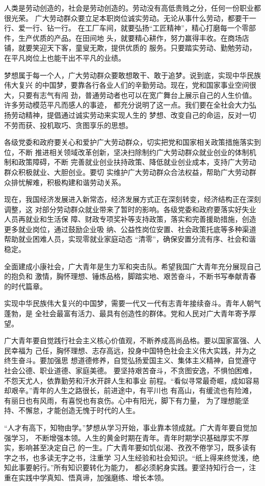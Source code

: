 \documentclass[11pt]{ctexart}
\begin{document}
{{{{人类是劳动创造的，社会是劳动创造的。劳动没有高低贵贱之分，任何一份职业都很光荣。
广大劳动群众要立足本职岗位诚实劳动。无论从事什么劳动，都要干一行、爱一行、钻一行。
在工厂车间，就要弘扬“工匠精神”，精心打磨每一个零部件，生产优质的产品。在田间地
头，就要精心耕作，努力赢得丰收。在商场店铺，就要笑迎天下客，童叟无欺，提供优质的
服务。只要踏实劳动、勤勉劳动，在平凡岗位上也能干出不平凡的业绩。

梦想属于每一个人，广大劳动群众要敢想敢干、敢于追梦。说到底，实现中华民族伟大复兴
的中国梦，要靠各行各业人们的辛勤劳动。现在，党和国家事业空间很大，只要有志气有闯
劲，普通劳动者也可以在宽广舞台上展示自己的人生价值。许多劳动模范平凡而感人的事迹，
都充分说明了这一点。我们要在全社会大力弘扬劳动精神，提倡通过诚实劳动来实现人生的
梦想、改变自己的命运，反对一切不劳而获、投机取巧、贪图享乐的思想。

各级党委和政府要关心和爱护广大劳动群众，切实把党和国家相关政策措施落实到位，不断
推进相关领域改革创新，坚决扫除制约广大劳动群众就业创业的体制机制和政策障碍，不断
完善就业创业扶持政策、降低就业创业成本，支持广大劳动群众积极就业、大胆创业。要切
实维护广大劳动群众合法权益，帮助广大劳动群众排忧解难，积极构建和谐劳动关系。

现在，我国经济发展进入新常态，经济发展方式正在深刻转变，经济结构正在深刻调整，这
对部分劳动群众就业带来了暂时的影响。各级党委和政府要落实好失业人员再就业和生活保
障、财政专项奖补等支持政策，落实和完善援助措施，创造更多就业岗位，通过鼓励企业吸
纳、公益性岗位安置、社会政策托底等多种渠道帮助就业困难人员，实现零就业家庭动态
“清零”，确保安置分流有序、社会和谐稳定。

全面建成小康社会，广大青年是生力军和突击队。希望我国广大青年充分展现自己的抱负和
激情，胸怀理想、锤炼品格，脚踏实地、艰苦奋斗，不断书写奉献青春的时代篇章。

实现中华民族伟大复兴的中国梦，需要一代又一代有志青年接续奋斗。青年人朝气蓬勃，是
全社会最富有活力、最具有创造性的群体。党和人民对广大青年寄予厚望。

广大青年要自觉践行社会主义核心价值观，不断养成高尚品格。要以国家富强、人民幸福为
己任，胸怀理想、志存高远，投身中国特色社会主义伟大实践，并为之终生奋斗。要加强思
想道德修养，自觉弘扬爱国主义、集体主义精神，自觉遵守社会公德、职业道德、家庭美德。
要坚持艰苦奋斗，不贪图安逸，不惧怕困难，不怨天尤人，依靠勤劳和汗水开辟人生和事业
前程。“看似寻常最奇崛，成如容易却艰辛。”青年的人生之路很长，前进途中，有平川也
有高山，有缓流也有险滩，有丽日也有风雨，有喜悦也有哀伤。心中有阳光，脚下有力量，
为了理想能坚持、不懈怠，才能创造无愧于时代的人生。

“人才有高下，知物由学。”梦想从学习开始，事业靠本领成就。广大青年要自觉加强学习，
不断增强本领。人生的黄金时期在青年。青年时期学识基础厚实不厚实，影响甚至决定自己
的一生。广大青年要如饥似渴、孜孜不倦学习，既多读有字之书，也多读无字之书，注重学
习人生经验和社会知识。“纸上得来终觉浅，绝知此事要躬行。”所有知识要转化为能力，
都必须躬身实践。要坚持知行合一，注重在实践中学真知、悟真谛，加强磨练、增长本领。

}}}}
\end{document}
